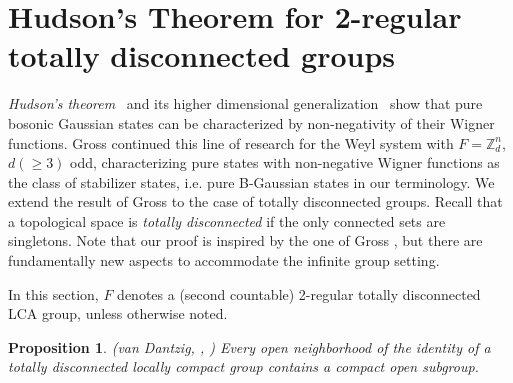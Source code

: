 \documentclass[12pt,reqno]{amsart}
\newtheorem{prop}[thm]{Proposition}
\theoremstyle{definition}
\theoremstyle{definition}
\theoremstyle{definition}
\numberwithin{thm}{section}
\numberwithin{equation}{section}
\newcommand{\z}{\mathbb{Z}}
\begin{document}
\section{Hudson's Theorem for 2-regular totally disconnected groups} \label{sec-Hudson}


\textit{Hudson's theorem}~\cite{hudson1974wigner} and its higher dimensional generalization~\cite{soto1983wigner} show that %
pure bosonic Gaussian states can be characterized by non-negativity of their Wigner functions. Gross \cite{Gro} continued this line of research for the Weyl system with $F=\z_d^n$, $d(\geq 3)$ odd, characterizing pure states with non-negative Wigner functions as the class of stabilizer states, i.e. pure B-Gaussian states in our terminology. We extend the result of Gross to the case of totally disconnected groups. Recall that a topological space is \textit{totally disconnected} if the only connected sets are singletons. Note that our proof is inspired by the one of Gross \cite{Gro}, but there are fundamentally new aspects to accommodate the infinite group setting.

In this section, $F$ denotes a (second countable) 2-regular totally disconnected LCA group, unless otherwise noted.

\begin{prop}\label{prop-Dantzig}(\textit{van Dantzig}, \cite{Da36}, \cite[Theorem 7.7]{HewittRoss})
Every open neighborhood of the identity of a totally disconnected locally compact
group contains a compact open subgroup.
\end{prop}
\end{document}
